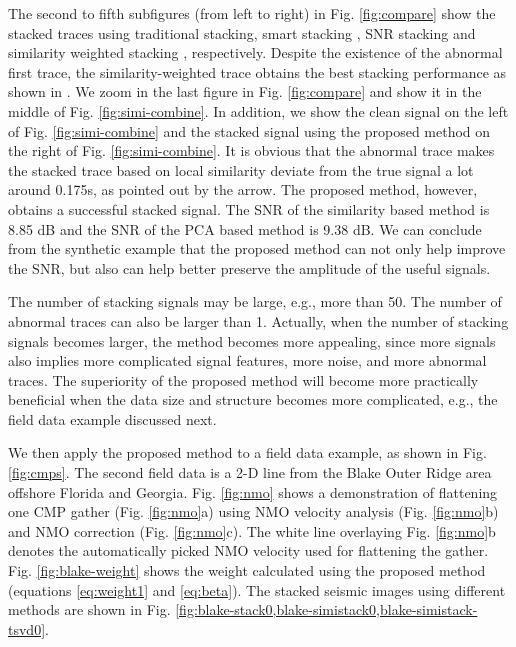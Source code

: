 The second to fifth subfigures (from left to right) in Fig. \ref{fig:compare} show the stacked traces using traditional stacking, smart stacking \cite[]{Rashed08}, SNR stacking \cite[]{Neelamani06} and similarity weighted stacking  \cite[]{Liu09}, respectively. Despite the existence of the abnormal first trace, the similarity-weighted trace obtains the best stacking performance as shown in \cite{Liu09}. We zoom in the last figure in Fig. \ref{fig:compare} and show it in the middle of Fig. \ref{fig:simi-combine}. In addition, we show the clean signal on the left of Fig. \ref{fig:simi-combine} and the stacked signal using the proposed method on the right of Fig. \ref{fig:simi-combine}. It is obvious that the abnormal trace makes the stacked trace based on local similarity deviate from the true signal a lot around 0.175s, as pointed out by the arrow. The proposed method, however, obtains a successful stacked signal.  The SNR of the similarity based method is 8.85 dB and the SNR of the PCA based method is 9.38 dB. We can conclude from the synthetic example that the proposed method can not only help improve the SNR, but also can help better preserve the amplitude of the useful signals. %

The number of stacking signals may be large, e.g., more than 50. The number of abnormal traces can also be larger than 1. Actually, when the number of stacking signals becomes larger, the method becomes more appealing, since more signals also implies more complicated signal features, more noise, and more abnormal traces. The superiority of the proposed method will become more practically beneficial when the data size and structure becomes more complicated, e.g., the field data example discussed next.

We then apply the proposed method to a field data example, as shown in Fig. \ref{fig:cmps}. The second field data is a 2-D line from the Blake Outer Ridge area offshore Florida and Georgia. Fig. \ref{fig:nmo} shows a demonstration of flattening one CMP gather (Fig. \ref{fig:nmo}a) using NMO velocity analysis (Fig. \ref{fig:nmo}b) and NMO correction (Fig. \ref{fig:nmo}c). The white line overlaying Fig. \ref{fig:nmo}b denotes the automatically picked NMO velocity used for flattening the gather. Fig. \ref{fig:blake-weight} shows the weight calculated using the proposed method (equations \ref{eq:weight1} and \ref{eq:beta}). The stacked seismic images using different methods are shown in Fig. \ref{fig:blake-stack0,blake-simistack0,blake-simistack-tsvd0}. 

